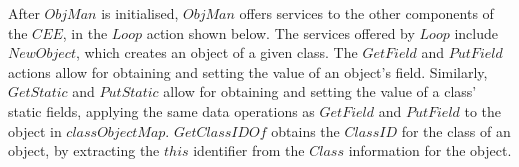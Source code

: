 
After $ObjMan$ is initialised, $ObjMan$ offers services to the other
components of the $CEE$, in the $Loop$ action shown below.
The services offered by $Loop$ include $NewObject$, which creates an
object of a given class.
The $GetField$ and $PutField$ actions allow for obtaining and setting
the value of an object's field.
Similarly, $GetStatic$ and $PutStatic$ allow for obtaining and setting
the value of a class' static fields, applying the same data operations
as $GetField$ and $PutField$ to the object in $classObjectMap$.
$GetClassIDOf$ obtains the $ClassID$ for the class of an object, by
extracting the $this$ identifier from the $Class$ information for the
object.

